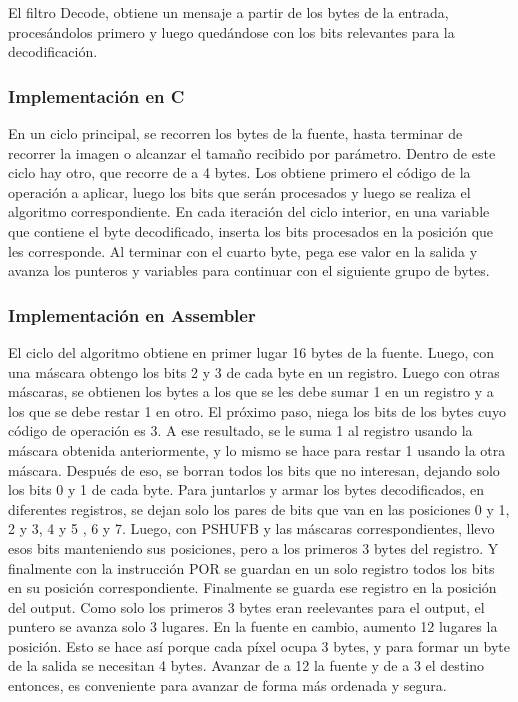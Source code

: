 El filtro Decode, obtiene un mensaje a partir de los bytes de la entrada, proces\'andolos primero y luego qued\'andose con los bits relevantes para la 
decodificaci\'on.

\subsubsection{Implementación en C}
En un ciclo principal, se recorren los bytes de la fuente, hasta terminar de recorrer la imagen o alcanzar el tamaño recibido por par\'ametro. Dentro de 
este ciclo hay otro, que recorre de a 4 bytes. Los obtiene primero el c\'odigo de la operación a aplicar, luego los bits que ser\'an procesados y luego 
se realiza el algoritmo correspondiente. En cada iteraci\'on del ciclo interior, en una variable que contiene el byte decodificado, inserta los bits 
procesados en la posici\'on que les corresponde. Al terminar con el cuarto byte, pega ese valor en la salida y avanza los punteros y variables para 
continuar con el siguiente grupo de bytes.

\subsubsection{Implementación en Assembler}
El ciclo del algoritmo obtiene en primer lugar 16 bytes de la fuente. Luego, con una m\'ascara obtengo los bits 2 y 3 de cada byte en un registro. Luego 
con otras m\'ascaras, se obtienen los bytes a los que se les debe sumar 1 en un registro y a los que se debe restar 1 en otro. El pr\'oximo paso, niega 
los bits de los bytes cuyo c\'odigo de operaci\'on es 3. A ese resultado, se le suma 1 al registro usando la m\'ascara obtenida anteriormente, y lo mismo 
se hace para restar 1 usando la otra m\'ascara. Despu\'es de eso, se borran todos los bits que no interesan, dejando solo los bits 0 y 1 de cada byte.\newline
Para juntarlos y armar los bytes decodificados, en diferentes registros, se dejan solo los pares de bits que van en las posiciones 0 y 1, 2 y 3, 4 y 5 , 
6 y 7. Luego, con PSHUFB y las m\'ascaras correspondientes, llevo esos bits manteniendo sus posiciones, pero a los primeros 3 bytes del registro. Y 
finalmente con la instrucci\'on POR se guardan en un solo registro todos los bits en su posici\'on correspondiente. Finalmente se guarda ese registro en 
la posición del output. Como solo los primeros 3 bytes eran reelevantes para el output, el puntero se avanza solo 3 lugares. En la fuente en cambio, 
aumento 12 lugares la posici\'on. Esto se hace as\'i porque cada p\'ixel ocupa 3 bytes, y para formar un byte de la salida se necesitan 4 bytes. Avanzar de
 a 12 la fuente y de a 3 el destino entonces, es conveniente para avanzar de forma m\'as ordenada y segura.

